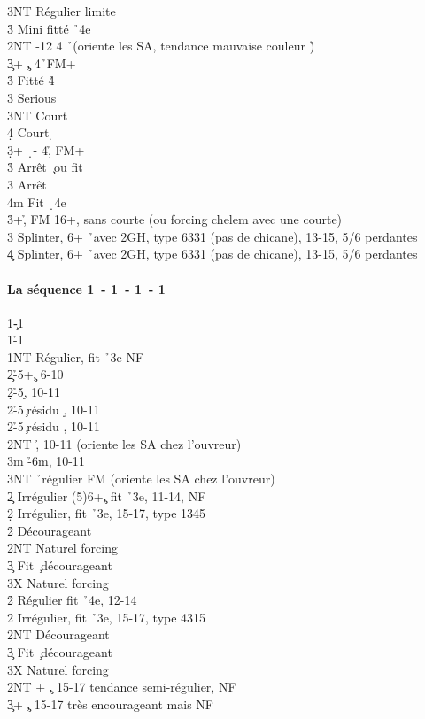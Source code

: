 \documentclass[a4paper]{article}
\begin{document}
\begin{bidtable}
3NT \> Régulier limite\-\\
3\h \> Mini fitté \h\ 4e\-\\
2NT -12 4 \h\ (oriente les SA, tendance mauvaise couleur \h )\\
3\c {}+ \c , 4\h\ FM+\+\\
3\h \> Fitté 4\h \+\\
3\s \> Serious\\
3NT \> Court \s \\
4\d \> Court \d \-\-\\
3\d {}+ \d\ - 4\h , FM+\+\\
3\h \> Arrêt \c\ ou fit \h \\
3\s \> Arrêt \s \\
4m \> Fit \d\ 4e\-\\
3\h {}+\h , FM 16+, sans courte (ou forcing chelem avec une courte)\\
3\s \> Splinter, 6+ \h\ avec 2GH, type 6331 (pas de chicane), 13-15, 5/6 perdantes\\
4\c\d \> Splinter, 6+ \h\ avec 2GH, type 6331 (pas de chicane), 13-15, 5/6 perdantes\-
\end{bidtable}

\paragraph{La séquence 1\pdfc\ - 1\pdfd\ - 1\pdfh\ - 1\pdfs}

\begin{bidtable}
1\c-1\d\\
1\h-1\s\\
1NT \> Régulier, fit \h\ 3e NF\+\\
2\c {}\h -5+\c , 6-10\\
2\d {}\h -5\d , 10-11\\
2\h {}\h -5\c\ résidu \d , 10-11\\
2\s {}\h -5\c\ résidu \s , 10-11\\
2NT \h , 10-11 (oriente les SA chez l'ouvreur)\\
3m \h -6m, 10-11\\
3NT \h\ régulier FM (oriente les SA chez l'ouvreur)\-\\
2\c \> Irrégulier (5)6+\c , fit \h\ 3e, 11-14, NF\\
2\d \> Irrégulier, fit \h\ 3e, 15-17, type 1345\+\\
2\h\s \> Décourageant\\
2NT \> Naturel forcing\\
3\c \> Fit \c\ décourageant\\
3X \> Naturel forcing\-\\
2\h \> Régulier fit \h\ 4e, 12-14\\
2\s \> Irrégulier, fit \h\ 3e, 15-17, type 4315\+\\
2NT \> Décourageant\\
3\c \> Fit \c\ décourageant\\
3X \> Naturel forcing\-\\
2NT + \c , 15-17 tendance semi-régulier, NF\\
3\c {}+ \c , 15-17 très encourageant mais NF
\end{bidtable}
\end{document}
